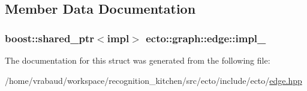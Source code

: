 \subsection{Member Data Documentation}
\hypertarget{structecto_1_1graph_1_1edge_a88b7d991f162cd009884c3061da8169d}{
\subsubsection[{impl\-\_\-}]{\setlength{\rightskip}{0pt plus 5cm}boost\-::shared\-\_\-ptr$<$impl$>$ ecto\-::graph\-::edge\-::impl\-\_\-\hspace{0.3cm}{\ttfamily [private]}}}\label{structecto_1_1graph_1_1edge_a88b7d991f162cd009884c3061da8169d}


The documentation for this struct was generated from the following file\-:\begin{DoxyCompactItemize}
\item 
/home/vrabaud/workspace/recognition\-\_\-kitchen/src/ecto/include/ecto/\hyperlink{edge_8hpp}{edge.\-hpp}\end{DoxyCompactItemize}
